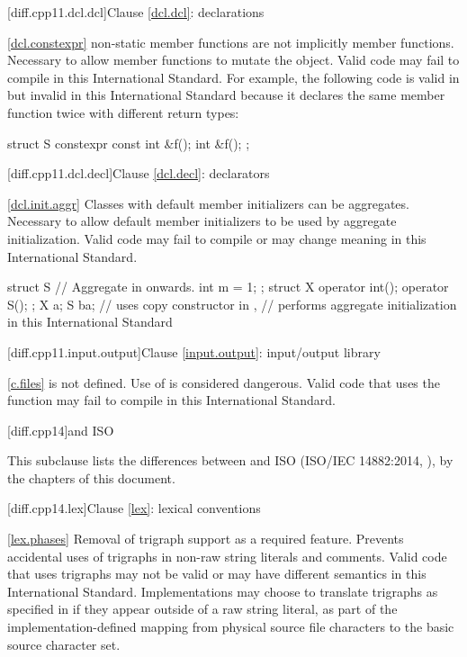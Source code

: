 [diff.cpp11.dcl.dcl]{Clause \ref{dcl.dcl}: declarations}

\ref{dcl.constexpr}
\change {} non-static member functions are not implicitly
 member functions.
\rationale Necessary to allow  member functions to mutate
the object.
\effect
Valid \CppXI code may fail to compile in this International Standard.
For example, the following code is valid in \CppXI
but invalid in this International Standard because it declares the same member
function twice with different return types:

\begin{codeblock}
struct S {
  constexpr const int &f();
  int &f();
};
\end{codeblock}

[diff.cpp11.dcl.decl]{Clause \ref{dcl.decl}: declarators}

\ref{dcl.init.aggr}
\change Classes with default member initializers can be aggregates.
\rationale Necessary to allow default member initializers to be used
by aggregate initialization.
\effect
Valid \CppXI code may fail to compile or may change meaning in this International Standard.
\begin{codeblock}
struct S { // Aggregate in \CppXIV onwards.
  int m = 1;
};
struct X {
  operator int();
  operator S();
};
X a{};
S b{a};  // uses copy constructor in \CppXI,
         // performs aggregate initialization in this International Standard
\end{codeblock}

[diff.cpp11.input.output]{Clause \ref{input.output}: input/output library}

\ref{c.files}
\change {} is not defined.
\rationale Use of  is considered dangerous.
\effect
Valid \CppXI code that uses the  function may fail to compile
in this International Standard.

[diff.cpp14]{\Cpp and ISO \CppXIV}

\pnum
{}%
This subclause lists the differences between \Cpp and
ISO \CppXIV (ISO/IEC 14882:2014, ),
by the chapters of this document.

[diff.cpp14.lex]{Clause \ref{lex}: lexical conventions}

\ref{lex.phases}
%
\change Removal of trigraph support as a required feature.
\rationale Prevents accidental uses of trigraphs in non-raw string literals and comments.
\effect
Valid \CppXIV code that uses trigraphs may not be valid or may have different
semantics in this International Standard. Implementations may choose to
translate trigraphs as specified in \CppXIV if they appear outside of a raw
string literal, as part of the implementation-defined mapping from physical
source file characters to the basic source character set.

